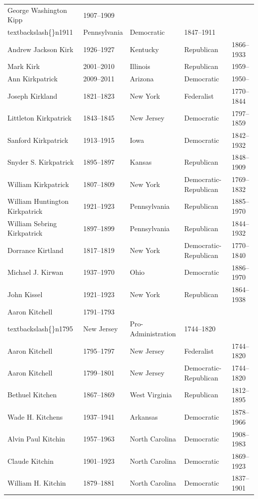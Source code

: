 \documentclass{article}
\begin{document}
\begin{tabular}{lllll}
George Washington Kipp & 1907–1909\\textbackslash\{\}n1911 & Pennsylvania & Democratic & 1847–1911 \\
Andrew Jackson Kirk & 1926–1927 & Kentucky & Republican & 1866–1933 \\
Mark Kirk & 2001–2010 & Illinois & Republican & 1959– \\
Ann Kirkpatrick & 2009–2011 & Arizona & Democratic & 1950– \\
Joseph Kirkland & 1821–1823 & New York & Federalist & 1770–1844 \\
Littleton Kirkpatrick & 1843–1845 & New Jersey & Democratic & 1797–1859 \\
Sanford Kirkpatrick & 1913–1915 & Iowa & Democratic & 1842–1932 \\
Snyder S. Kirkpatrick & 1895–1897 & Kansas & Republican & 1848–1909 \\
William Kirkpatrick & 1807–1809 & New York & Democratic-Republican & 1769–1832 \\
William Huntington Kirkpatrick & 1921–1923 & Pennsylvania & Republican & 1885–1970 \\
William Sebring Kirkpatrick & 1897–1899 & Pennsylvania & Republican & 1844–1932 \\
Dorrance Kirtland & 1817–1819 & New York & Democratic-Republican & 1770–1840 \\
Michael J. Kirwan & 1937–1970 & Ohio & Democratic & 1886–1970 \\
John Kissel & 1921–1923 & New York & Republican & 1864–1938 \\
Aaron Kitchell & 1791–1793\\textbackslash\{\}n1795 & New Jersey & Pro-Administration & 1744–1820 \\
Aaron Kitchell & 1795–1797 & New Jersey & Federalist & 1744–1820 \\
Aaron Kitchell & 1799–1801 & New Jersey & Democratic-Republican & 1744–1820 \\
Bethuel Kitchen & 1867–1869 & West Virginia & Republican & 1812–1895 \\
Wade H. Kitchens & 1937–1941 & Arkansas & Democratic & 1878–1966 \\
Alvin Paul Kitchin & 1957–1963 & North Carolina & Democratic & 1908–1983 \\
Claude Kitchin & 1901–1923 & North Carolina & Democratic & 1869–1923 \\
William H. Kitchin & 1879–1881 & North Carolina & Democratic & 1837–1901 \\

\end{tabular}
\end{document}

